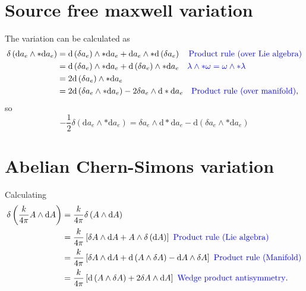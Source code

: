 \documentclass{article}
\begin{document}
\appendix
\newpage
\section{Source free maxwell variation}
\label{appendixsourcefreemaxwell}
The variation can be calculated as
\begin{align}
    \delta\left(\mathrm{d}a_{e} \wedge * \mathrm{d}a_{e}\right) &= \mathrm{d}\left(\delta a_{e} \right)\wedge * \mathrm{d}a_{e} + \mathrm{d}a_{e}\wedge * \mathrm{d}\left(\delta a_{e} \right) \nonumber \color{blue}\quad \text{Product rule (over Lie algebra)} \color{black} \\
    &= \mathrm{d}\left(\delta a_{e} \right)\wedge * \mathrm{d}a_{e} + \mathrm{d}\left(\delta a_{e} \right)\wedge *\mathrm{d}a_{e}\nonumber\color{blue}\quad \lambda\wedge * \omega  = \omega \wedge * \lambda\color{black}\\
    &= 2\mathrm{d}\left(\delta a_{e}\right)\wedge * \mathrm{d}a_{e}\nonumber \\
    &= 2\mathrm{d}\left(\delta a_{e}\wedge * \mathrm{d}a_{e} \right) - 2 \delta a_{e}\wedge \mathrm{d}*\mathrm{d}a_{e}\nonumber\quad \color{blue} \text{Product rule (over manifold)} \color{black},
\end{align}
so
\begin{equation}
    \boxed{
    -\frac{1}{2}\delta\left(\mathrm{d}a_{e} \wedge * \mathrm{d}a_{e}\right) = \delta a_{e}\wedge \mathrm{d}*\mathrm{d}a_{e} - \mathrm{d}\left(\delta a_{e}\wedge *\mathrm{d}a_{e} \right)
    }
\end{equation}


\section{Abelian Chern-Simons variation}
\label{appendixabelianchernsimonsvariation}
Calculating
\begin{align}
    \delta\left(\frac{k}{4\pi}A\wedge \mathrm{d} A \right) &= \frac{k}{4\pi}\delta\left(A\wedge \mathrm{d}A\right)\nonumber\\
    &= \frac{k}{4\pi}\left[\delta A \wedge \mathrm{d}A + A\wedge \delta\left(\mathrm{d}A\right)\right]\color{blue}\text{ Product rule (Lie algebra)}\color{black}\nonumber\\
    &= \frac{k}{4\pi}\left[\delta A \wedge \mathrm{d}A + \mathrm{d}\left(A\wedge \delta A\right)-\mathrm{d}A\wedge \delta A\right]\color{blue}\text{ Product rule (Manifold)}\color{black}\nonumber\\
    &= \frac{k}{4\pi}\left[\mathrm{d}\left(A\wedge \delta A \right) + 2\delta A \wedge \mathrm{d}A\right] \color{blue}\text{ Wedge product antisymmetry}\color{black}.\nonumber 
\end{align}
\end{document}
